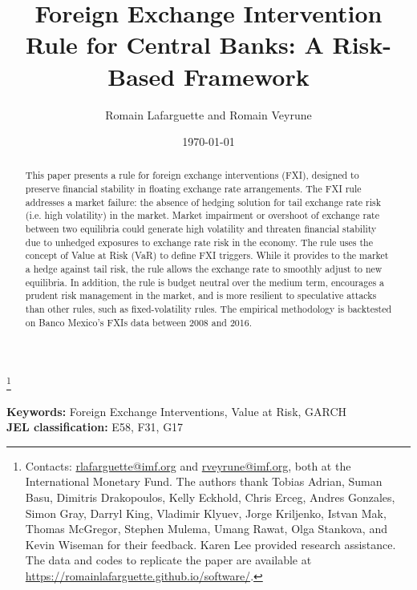 \documentclass[11pt]{article}
\title{\textbf{Foreign Exchange Intervention Rule for Central Banks:
A Risk-Based Framework}}
\author{Romain Lafarguette and Romain Veyrune}
\date{\today}
\newcommand\blfootnote[1]{%
  \begingroup
  \renewcommand\thefootnote{}\footnote{#1}%
  \addtocounter{footnote}{-1}%
  \endgroup
}
\begin{document}
\maketitle      \blfootnote{Contacts:      \url{rlafarguette@imf.org}      and
\url{rveyrune@imf.org}, both at the  International Monetary Fund.  The authors
thank Tobias  Adrian, Suman Basu,  Dimitris Drakopoulos, Kelly  Eckhold, Chris
Erceg,  Andres  Gonzales, Simon  Gray,  Darryl  King, Vladimir  Klyuev,  Jorge
Kriljenko,  Istvan Mak,  Thomas McGregor,  Stephen Mulema,  Umang Rawat,  Olga
Stankova,  and Kevin  Wiseman  for  their feedback.  Karen  Lee
provided research assistance.   The data and codes to replicate
the paper are available at
\url{https://romainlafarguette.github.io/software/}.}


\begin{abstract} This paper presents a rule for foreign exchange interventions
(FXI),  designed to  preserve financial  stability in  floating exchange  rate
arrangements. The FXI rule addresses a  market failure: the absence of hedging
solution for  tail exchange rate risk  (i.e.  high volatility) in  the market.
Market impairment or  overshoot of exchange rate between  two equilibria could
generate  high volatility  and threaten  financial stability  due to  unhedged
exposures to exchange rate  risk in the economy.  The rule  uses the concept of
Value at Risk (VaR) to define FXI  triggers. While it provides to the market a
hedge against tail risk, the rule  allows the exchange rate to smoothly adjust
to new  equilibria.  In addition, the  rule is budget neutral  over the medium
term,  encourages  a prudent  risk  management  in  the  market, and  is  more
resilient to  speculative attacks than  other rules, such  as fixed-volatility
rules.  The  empirical methodology is  backtested on Banco Mexico's  FXIs data
between 2008 and 2016.\\
\end{abstract}


\noindent \textbf{Keywords:} Foreign Exchange Interventions, Value at Risk, GARCH\\ 
\noindent \textbf{JEL classification:} E58, F31, G17

\thispagestyle{empty} 
\newpage
{}
\end{document}
